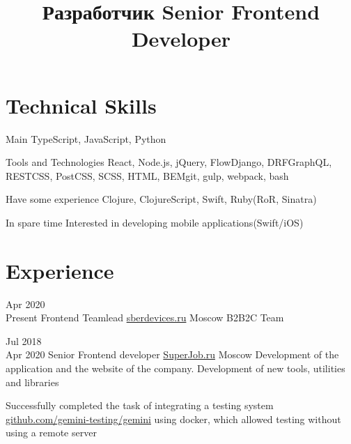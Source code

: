 \documentclass[11pt,a4paper,sans]{moderncv}
\title
	{\lang
		{Разработчик}
		{Senior Frontend Developer}}
\newcommand{\lang}[2]{#2}
\begin{document}
\maketitle

\section
{\lang
	{Технические навыки}
	{Technical Skills}}

\cvline
{\lang
	{Главное}
	{Main}}
{TypeScript, JavaScript, Python}

\cvline
{\lang
	{Использую инструменты и технологии}
	{Tools and Technologies}}
{React, Node.js, jQuery, Flow{\newline}Django, DRF{\newline}GraphQL, REST{\newline}CSS, PostCSS, SCSS, HTML, BEM{\newline}git, gulp, webpack, bash}

\cvline
{\lang
	{Имею небольшой опыт}
	{Have some experience}}
{Clojure, ClojureScript, Swift, Ruby(RoR, Sinatra)}

\cvline
{\lang
	{В свободное время}
	{In spare time}}
{\lang
	{интересуюсь мобильной разработкой iOS}
	{Interested in developing mobile applications(Swift/iOS)}}

\section
{\lang
	{Опыт работы}
	{Experience}}


	\cventry
		{\lang{Апр}{Apr} 2020\\\lang{по н.в.}{Present}}
		{\lang
			{Фронтенд разработчик}
			{Frontend Teamlead}}
		{\href{https://sberdevices.ru}{sberdevices.ru}}
		{\lang
			{Москва}
			{Moscow}}
		{}
		{\lang
			{B2B2C}
			{B2B2C Team}\\}


	\cventry
		{\lang{Июл}{Jul} 2018\\\lang{Апр}{Apr} 2020}
		{\lang
			{Фронтенд разработчик}
			{Senior Frontend developer}}
		{\href{https://superjob.ru}{SuperJob.ru}}
		{\lang
			{Москва}
			{Moscow}}
		{}
		{\lang
			{Разработка и поддержка сайта компании, создание новых инструментов, утилит и библиотек}
			{Development of the application and the website of the company. Development of new tools, utilities and libraries}}
			
		\cvlistitem
		{\lang
			{Успешно реализовал задачу по интеграции системы тестирования gemini(\href{https://github.com/gemini-testing/gemini}{github.com/gemini-testing/gemini}) используя docker, что позволило проводить тестирование без использования удаленного сервера}
			{Successfully completed the task of integrating a testing system \href{https://github.com/gemini-testing/gemini}{github.com/gemini-testing/gemini} using docker, which allowed testing without using a remote server}\\}
\end{document}
